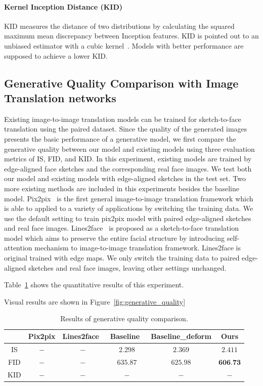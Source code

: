 \paragraph{Kernel Inception Distance (KID)}
KID measures the distance of two distributions by calculating the squared maximum mean discrepancy between Inception features. KID is pointed out to an unbiased estimator with a cubic kernel~\cite{KID}. Models with better performance are supposed to achieve a lower KID.

\subsection{Generative Quality Comparison with Image Translation networks}

Existing image-to-image translation models can be trained for sketch-to-face translation using the paired dataset. 
Since the quality of the generated images presents the basic performance of a generative model, we first compare the generative quality between our model and existing models using three evaluation metrics of IS, FID, and KID. In this experiment, existing models are trained by edge-aligned face sketches and the corresponding real face images. 
We test both our model and existing models with edge-aligned sketches in the test set. Two more existing methods are included in this experiments besides the baseline model. Pix2pix~\cite{pix2pix} is the first general image-to-image translation framework which is able to applied to a variety of applications by switching the training data. We use the default setting to train pix2pix model with paired edge-aligned sketches and real face images. Lines2face~\cite{Lines2Face} is proposed as a sketch-to-face translation model which aims to preserve the entire facial structure by introducing self-attention mechanism to image-to-image translation framework. Lines2face is original trained with edge maps. We only switch the training data to paired edge-aligned sketches and real face images, leaving other settings unchanged.

Table~\ref{tab:generative_quality} shows the quantitative results of this experiment. 

Visual results are shown in Figure~\ref{fig:generative_quality}

\begin{table}[h]
	\centering	
	\caption{Results of generative quality comparison.}
	\begin{tabular}{|c|c|c|c|c|c|}\hline
		& Pix2pix \cite{pix2pix} & Lines2face~\cite{Lines2Face} & Baseline~\cite{pix2pixHD} & Baseline\_deform & Ours \\\hline
		IS & $-$ & $-$ & $2.298$ & $2.369$ & $2.411$\\\hline
		FID & $-$ & $-$ & $635.87$ & $625.98$ & $\textbf{606.73}$\\\hline
		KID & $-$ & $-$ & $-$ & $-$ & $-$\\\hline
	\end{tabular}
	\label{tab:generative_quality}
\end{table} 

